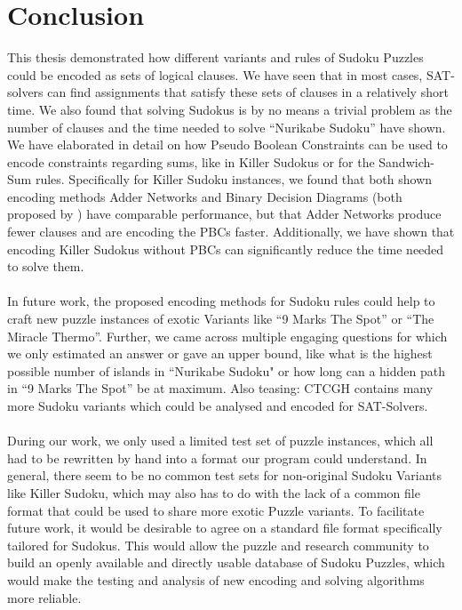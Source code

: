 \chapter{Conclusion}
This thesis demonstrated how different variants and rules of Sudoku Puzzles could be encoded as sets of logical clauses. We have seen that in most cases, SAT-solvers can find assignments that satisfy these sets of clauses in a relatively short time. We also found that solving Sudokus is by no means a trivial problem as the number of clauses and the time needed to solve ``Nurikabe Sudoku'' have shown. We have elaborated in detail on how Pseudo Boolean Constraints can be used to encode constraints regarding sums, like in Killer Sudokus or for the Sandwich-Sum rules. Specifically for Killer Sudoku instances, we found that both shown encoding methods Adder Networks and Binary Decision Diagrams (both proposed by \cite{Een2006TranslatingPC}) have comparable performance, but that Adder Networks produce fewer clauses and are encoding the PBCs faster. Additionally, we have shown that encoding Killer Sudokus without PBCs can significantly reduce the time needed to solve them.\\
\\
In future work, the proposed encoding methods for Sudoku rules could help to craft new puzzle instances of exotic Variants like ``9 Marks The Spot'' or ``The Miracle Thermo''. Further, we came across multiple engaging questions for which we only estimated an answer or gave an upper bound, like what is the highest possible number of islands in ``Nurikabe Sudoku" or how long can a hidden path in ``9 Marks The Spot'' be at maximum. Also teasing: CTCGH \cite{CrackingTheCryptic2021} contains many more Sudoku variants which could be analysed and encoded for SAT-Solvers.\\
\\
During our work, we only used a limited test set of puzzle instances, which all had to be rewritten by hand into a format our program could understand. In general, there seem to be no common test sets for non-original Sudoku Variants like Killer Sudoku, which may also has to do with the lack of a common file format that could be used to share more exotic Puzzle variants. To facilitate future work, it would be desirable to agree on a standard file format specifically tailored for Sudokus. This would allow the puzzle and research community to build an openly available and directly usable database of Sudoku Puzzles, which would make the testing and analysis of new encoding and solving algorithms more reliable.